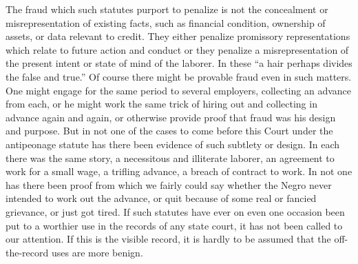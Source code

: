 \documentclass[
  letterpaper,
  11pt,
  DIV=9,
  openright]{scrbook}
\begin{document}
The fraud which such statutes purport to penalize is not the concealment
or misrepresentation of existing facts, such as financial condition,
ownership of assets, or data relevant to credit. They either penalize
promissory representations which relate to future action and conduct or
they penalize a misrepresentation of the present intent or state of mind
of the laborer. In these ``a hair perhaps divides the false and true.''
Of course there might be provable fraud even in such matters. One might
engage for the same period to several employers, collecting an advance
from each, or he might work the same trick of hiring out and collecting
in advance again and again, or otherwise provide proof that fraud was
his design and purpose. But in not one of the cases to come before this
Court under the antipeonage statute has there been evidence of such
subtlety or design. In each there was the same story, a necessitous and
illiterate laborer, an agreement to work for a small wage, a trifling
advance, a breach of contract to work. In not one has there been proof
from which we fairly could say whether the Negro never intended to work
out the advance, or quit because of some real or fancied grievance, or
just got tired. If such statutes have ever on even one occasion been put
to a worthier use in the records of any state court, it has not been
called to our attention. If this is the visible record, it is hardly to
be assumed that the off-the-record uses are more benign.
\end{document}
